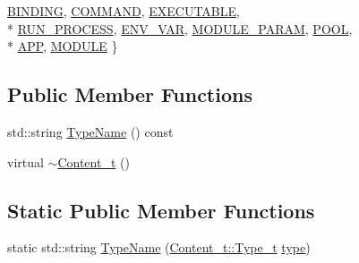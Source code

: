 \begin{DoxyCompactItemize}
\hyperlink{structparse_tree_1_1_content__t_a45cc4a193beac87a2045a2f6b6870d1ba4caae0cbb93a8e3f12e535387da82d2e}{B\+I\+N\+D\+I\+NG}, 
\hyperlink{structparse_tree_1_1_content__t_a45cc4a193beac87a2045a2f6b6870d1ba809bc2afd43897c664f06698956ddd04}{C\+O\+M\+M\+A\+ND}, 
\hyperlink{structparse_tree_1_1_content__t_a45cc4a193beac87a2045a2f6b6870d1ba9fdfc533ef64bbd12408a89dfcdec779}{E\+X\+E\+C\+U\+T\+A\+B\+LE}, 
\\*
\hyperlink{structparse_tree_1_1_content__t_a45cc4a193beac87a2045a2f6b6870d1bab14295f5538c8056552c9e21dd984cbf}{R\+U\+N\+\_\+\+P\+R\+O\+C\+E\+SS}, 
\hyperlink{structparse_tree_1_1_content__t_a45cc4a193beac87a2045a2f6b6870d1baa9d71aaf403dd54e0c7fed993e19d14b}{E\+N\+V\+\_\+\+V\+AR}, 
\hyperlink{structparse_tree_1_1_content__t_a45cc4a193beac87a2045a2f6b6870d1ba55c27abcb01baa81fdc514cd665f6f8d}{M\+O\+D\+U\+L\+E\+\_\+\+P\+A\+R\+AM}, 
\hyperlink{structparse_tree_1_1_content__t_a45cc4a193beac87a2045a2f6b6870d1badc31da6be9929b3ac2dce0d352c21abb}{P\+O\+OL}, 
\\*
\hyperlink{structparse_tree_1_1_content__t_a45cc4a193beac87a2045a2f6b6870d1baac78792931c7adc0f5660bb07b9a4851}{A\+PP}, 
\hyperlink{structparse_tree_1_1_content__t_a45cc4a193beac87a2045a2f6b6870d1ba979a070b1880374f52dcfe4bdfc4c78d}{M\+O\+D\+U\+LE}
 \}
\end{DoxyCompactItemize}
\subsection*{Public Member Functions}
\begin{DoxyCompactItemize}
\item 
std\+::string \hyperlink{structparse_tree_1_1_content__t_a854c29dbd5b4570a93c3d9203a100dae}{Type\+Name} () const 
\item 
virtual \hyperlink{structparse_tree_1_1_content__t_ab41d1ab7982dfa9c1cb319604e608015}{$\sim$\+Content\+\_\+t} ()
\end{DoxyCompactItemize}
\subsection*{Static Public Member Functions}
\begin{DoxyCompactItemize}
\item 
static std\+::string \hyperlink{structparse_tree_1_1_content__t_a249db9fb40e59772967701b4e0d66d41}{Type\+Name} (\hyperlink{structparse_tree_1_1_content__t_a45cc4a193beac87a2045a2f6b6870d1b}{Content\+\_\+t\+::\+Type\+\_\+t} \hyperlink{structparse_tree_1_1_content__t_a0f34791b6c4a7ffa174e222bdb73d9ff}{type})
\end{DoxyCompactItemize}
